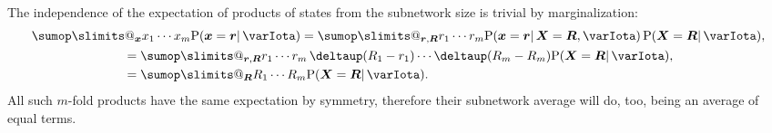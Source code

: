 \documentclass{article}
\makeatletter
\theoremstyle{remark}
\theoremstyle{innote}
\def\sum{\DOTSI\sumop\slimits@}
\newcommand*{\delt}{\deltaup}%
\renewcommand*{\|}{\mathpunct{|}}%
\newcommand*{\p}{\mathrm{P}}%
\theoremstyle{simple}
\newcommand*{\yxx}{x}%
\newcommand*{\yx}{\bm{\yxx}}%
\newcommand*{\yX}{\bm{X}}%
\newcommand*{\yr}{\bm{r}}%
\newcommand*{\yR}{\bm{R}}%
\newcommand*{\yH}{\varIota}
\makeatother
\begin{document}
  \bigskip The independence of the expectation of products of states from
  the subnetwork size is trivial by marginalization:
  \begin{multline}
    \label{noeq:margin_products}
    \sum_{\yx} x_1\dotsm x_m \p(\yx =\yr \| \yH)
      =\sum_{\yr,\yR}  r_1\dotsm r_m \p(\yx=\yr \| \yX=\yR,\yH)
      \, \p(\yX=\yR \| \yH),
      \\
      \begin{aligned}
      &=\sum_{\yr,\yR} r_1\dotsm r_m\,\delt(R_1-r_1)\dotsm\delt(R_m-R_m)
      \p(\yX = \yR \| \yH),
      \\
      &=\sum_{\yR} R_1\dotsm R_m \p(\yX =\yR \| \yH).
    \end{aligned}
  \end{multline}
  All such $m$-fold products have the same expectation by symmetry,
  therefore their subnetwork average will do, too, being an average of
  equal terms.
\end{document}
